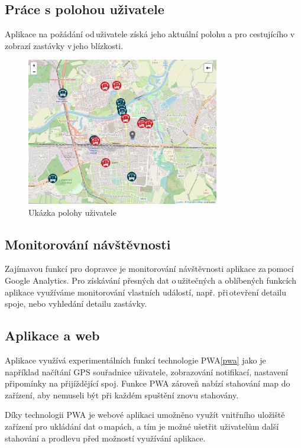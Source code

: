 \subsection{Práce s polohou uživatele}
Aplikace na požádání od\,uživatele získá jeho aktuální polohu a pro cestujícího v zobrazí zastávky v\,jeho blízkosti.

\begin{figure}[H]
    \centering
    \includegraphics[width=0.75\textwidth]{images/position.png}
    \caption{Ukázka polohy uživatele}
    \label{poloha}
\end{figure}
\subsection{Monitorování návštěvnosti}
Zajímavou funkcí pro dopravce je monitorování návštěvnosti aplikace za\,pomocí Google Analytics. Pro získávání přesných dat o\,užitečných a oblíbených funkcích aplikace využíváme monitorování vlastních událostí, např. při\,otevření detailu spoje, nebo vyhledání detailu zastávky.
\subsection{Aplikace a web}
Aplikace využívá experimentálních funkcí technologie PWA\ref{pwa} jako je například načítání GPS souřadnice uživatele, zobrazování notifikací, nastavení připomínky na přijíždějící spoj.
Funkce PWA zároveň nabízí stahování map do\,zařízení, aby nemuseli být při každém spuštění znovu stahovány.

Díky technologii PWA je webové aplikaci umožněno využít vnitřního uložiště zařízení pro ukládání dat o\,mapách, a tím je možné ušetřit uživatelům další stahování a prodlevu před možností využívání aplikace.
